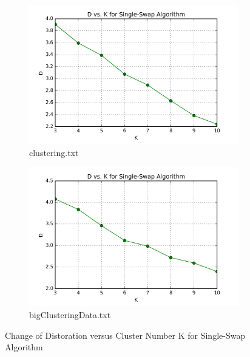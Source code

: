\begin{description}
\begin{description}
\begin{figure}[H]
\centering
\centering
        \begin{subfigure}[b]{0.49\textwidth}
            \centering
            \includegraphics[width=\textwidth]{./figures/loss_clustering_singleSwap.png}
            \caption{clustering.txt}\label{fig:7a}
        \end{subfigure}
        \hfill
        \begin{subfigure}[b]{0.49\textwidth}  
            \centering 
            \includegraphics[width=\textwidth]{./figures/loss_bigClustering_singleSwap.png}
            \caption{bigClusteringData.txt}\label{fig:7b}
        \end{subfigure}
\caption{Change of Distoration versus Cluster Number K for Single-Swap Algorithm}
\label{fig:single-swap-loss} 
\end{figure}


\end{description}
\end{description}
